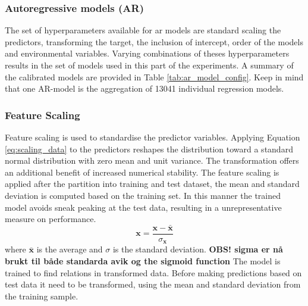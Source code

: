 \subsubsection{Autoregressive models (AR)}
The set of hyperparameters available for ar models are
standard scaling the predictors, transforming the target, the inclusion of intercept, order of the models and environmental variables. Varying combinations of theses hyperparameters results in the set of models used in this part of the experiments. 
A summary of the calibrated models are provided in Table \ref{tab:ar_model_config}. Keep in mind that one AR-model is the aggregation of 13041 individual regression models.  


\subsubsection{Feature Scaling} \label{sec:scaling_predictors}
Feature scaling is used to standardise the predictor variables.
Applying Equation \ref{eq:scaling_data} to the predictors reshapes the distribution toward a standard normal distribution with zero mean and unit variance. 
The transformation offers an additional benefit of increased numerical stability. %
The feature scaling is applied after the partition into training and test dataset, the mean and standard deviation is computed based on the training set. In this manner the trained model avoids sneak peaking at the test data, resulting in a unrepresentative measure on performance.
\begin{equation} \label{eq:scaling_data}
    \mathbf{x} = \frac{\mathbf{x} - \bar{\mathbf{x}}}{\sigma_{\mathbf{x}}}
\end{equation}
where $\bar{\mathbf{x}}$ is the average and $\sigma$ is the standard deviation. \textbf{OBS! sigma er nå brukt til både standarda avik og the sigmoid function}
The model is trained to find relations in transformed data. Before making predictions based on test data it need to be transformed, using the mean and standard deviation from the training sample.

